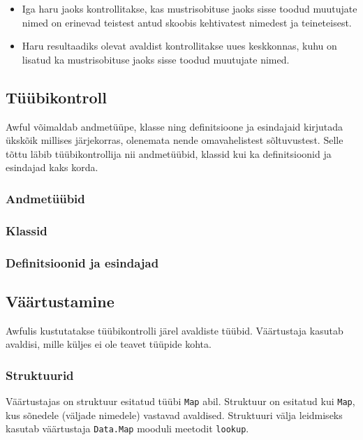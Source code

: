 \documentclass[12pt]{article}
\begin{document}
\begin{itemize}
\begin{itemize}
\begin{itemize}
                  \begin{itemize}
                    \item
                      Iga haru jaoks kontrollitakse, kas mustrisobituse jaoks sisse toodud muutujate nimed on erinevad teistest antud skoobis kehtivatest nimedest ja teineteisest.
                    \item
                      Haru resultaadiks olevat avaldist kontrollitakse uues keskkonnas, kuhu on lisatud ka mustrisobituse jaoks sisse toodud muutujate nimed.
                  \end{itemize}
              \end{itemize}
          \end{itemize}
      \end{itemize}
    \subsection{Tüübikontroll}
      Awful võimaldab andmetüüpe, klasse ning definitsioone ja esindajaid kirjutada ükskõik millises järjekorras, olenemata nende omavahelistest sõltuvustest. Selle tõttu läbib tüübikontrollija nii andmetüübid, klassid kui ka definitsioonid ja esindajad kaks korda.
      \subsubsection{Andmetüübid}
        
      \subsubsection{Klassid}
        
      \subsubsection{Definitsioonid ja esindajad}
        
    \subsection{Väärtustamine}
      Awfulis kustutatakse tüübikontrolli järel avaldiste tüübid. Väärtustaja kasutab avaldisi, mille küljes ei ole teavet tüüpide kohta.
      \subsubsection{Struktuurid}
        Väärtustajas on struktuur esitatud tüübi \verb!Map! abil. Struktuur on esitatud kui \verb!Map!, kus sõnedele (väljade nimedele) vastavad avaldised. Struktuuri välja leidmiseks kasutab väärtustaja \verb!Data.Map! mooduli meetodit \verb!lookup!.
\end{document}
